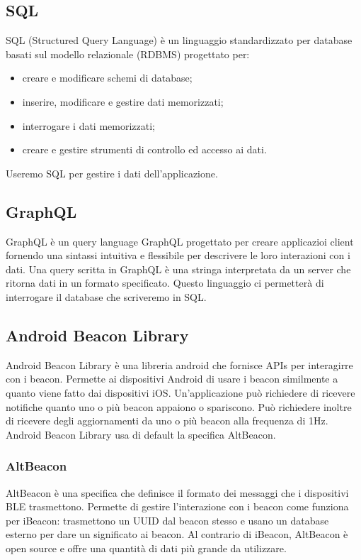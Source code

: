 \subsection{SQL}
	SQL (Structured Query Language) è un linguaggio standardizzato per database basati sul modello relazionale (RDBMS) progettato per:
	\begin{itemize}
		\item 	creare e modificare schemi di database;
		\item 	inserire, modificare e gestire dati memorizzati;
		\item 	interrogare i dati memorizzati;
		\item 	creare e gestire strumenti di controllo ed accesso ai dati.
	\end{itemize}
	Useremo SQL per gestire i dati dell'applicazione.
	
\subsection{GraphQL} 
	GraphQL è un query language GraphQL progettato per creare applicazioi client fornendo una sintassi intuitiva e flessibile per descrivere le loro interazioni con i dati. 
	Una query scritta in GraphQL è una stringa interpretata da un server che ritorna dati in un formato specificato. 
	Questo linguaggio ci permetterà di interrogare il database che scriveremo in SQL.

\subsection{Android Beacon Library}
	Android Beacon Library è una libreria android che fornisce APIs per interagirre con i beacon. Permette ai dispositivi Android di usare i beacon similmente a quanto viene fatto dai dispositivi iOS. Un'applicazione può richiedere di ricevere notifiche quanto uno o più beacon appaiono o spariscono. Può richiedere inoltre di ricevere degli aggiornamenti da uno o più beacon alla frequenza di 1Hz.
	Android Beacon Library usa di default la specifica AltBeacon.
	
\subsubsection{AltBeacon}
	AltBeacon è una specifica che definisce il formato dei messaggi che i dispositivi BLE trasmettono. Permette di gestire l'interazione con i beacon come funziona per iBeacon: trasmettono un UUID dal beacon stesso e usano un database esterno per dare un significato ai beacon.
	Al contrario di iBeacon, AltBeacon è open source e offre una quantità di dati più grande da utilizzare.
	
	
	
	
	